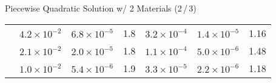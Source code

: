 \documentclass[svgnames]{beamer} %
\makeatletter
\let\HL\hl
\renewcommand\hl{%
	\let\set@color\beamerorig@set@color
	\let\reset@color\beamerorig@reset@color
	\HL}
\newcommand{\lTwo}{{\mathcal l^2}}
\newcommand{\errlTwo}[1]{e^{\lTwo}_{#1}}
\newcommand{\errInf}[1]{e^{\infty}_{#1}}
\makeatother
\begin{document}
\begin{frame}{Piecewise Quadratic Solution w/ 2 Materials (2\,/\,3)}
\begin{tabular}[1.1]{| c | c || c | c | c ||c | c |}
				\cline{2-7}
				& $4.2\times10^{-2}$ & $6.8\times10^{-5}$ & 1.8 & $3.2\times10^{-4}$ &$1.4\times10^{-5}$  & 1.16 \\ %
				\cline{2-7}
				& $2.1\times10^{-2}$ & $2.0\times10^{-5}$ & 1.8 & $1.1\times10^{-4}$ &$5.0\times10^{-6}$  & 1.48 \\ %
				\cline{2-7}
				& $1.0\times10^{-2}$ & $5.4\times10^{-6}$ & 1.9 & $3.3\times10^{-5}$ &$2.2\times10^{-6}$  & 1.18 \\ %
				\hline
			\end{tabular}

\end{frame}
\end{document}
